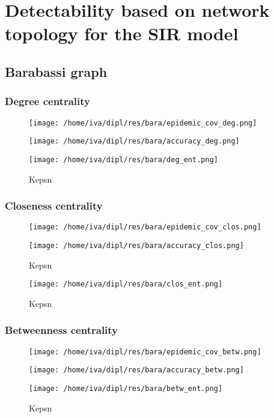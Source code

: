 \documentclass[times, utf8, diplomski]{fer}
\begin{document}
\section{Detectability based on network topology for the SIR model}
\subsection{Barabassi graph}

\subsubsection{Degree centrality}
\begin{figure}[H]
\texttt{[image: /home/iva/dipl/res/bara/epidemic\_cov\_deg.png]}
\end{figure}
\begin{figure}[H]
\texttt{[image: /home/iva/dipl/res/bara/accuracy\_deg.png]}
\end{figure}
\begin{figure}[H]
\texttt{[image: /home/iva/dipl/res/bara/deg\_ent.png]}
\caption{Kepsn}
\end{figure}

\subsubsection{Closeness centrality}
\begin{figure}[H]
\texttt{[image: /home/iva/dipl/res/bara/epidemic\_cov\_clos.png]}
\end{figure}
\begin{figure}[H]
\texttt{[image: /home/iva/dipl/res/bara/accuracy\_clos.png]}
\caption{Kepsn}
\end{figure}
\begin{figure}[H]
\texttt{[image: /home/iva/dipl/res/bara/clos\_ent.png]}
\caption{Kepsn}
\end{figure}

\subsubsection{Betweenness centrality}
\begin{figure}[H]
\texttt{[image: /home/iva/dipl/res/bara/epidemic\_cov\_betw.png]}
\end{figure}
\begin{figure}[H]
\texttt{[image: /home/iva/dipl/res/bara/accuracy\_betw.png]}
\end{figure}
\begin{figure}[H]
\texttt{[image: /home/iva/dipl/res/bara/betw\_ent.png]}
\caption{Kepsn}
\end{figure}
\end{document}
